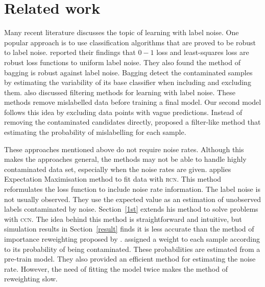 \documentclass[12pt]{article} %
\begin{document}
\section{Related work}
Many recent literature discusses the topic of learning with label noise. One popular approach is to use classification algorithms that are proved to be robust to label noise. \citet{frenay2014classification} reported their findings that $0-1$ loss and least-squares loss are robust loss functions to uniform label noise. %
They also found the method of bagging is robust against label noise. Bagging detect the contaminated samples by estimating the variability of its base classifier when including and excluding them. %
\citet{frenay2014classification} also discussed filtering methods for learning with label noise. These methods remove mislabelled data before training a final model. Our second model follows this idea by excluding data points with vague predictions. Instead of removing the contaminated candidates directly, \citet{yang2018adasampling} proposed a filter-like method that estimating the probability of mislabelling for each sample.

These approaches mentioned above do not require noise rates. Although this makes the approaches general, the methods may not be able to handle highly contaminated data set, especially when the noise rates are given. \citet{pmlr-v20-biggio11} applies Expectation Maximisation method to fit data with \textsc{rcn}. This method reformulates the loss function to include noise rate information. The label noise is not usually observed. They use the expected value as an estimation of unobserved labels contaminated by noise. Section~\ref{1st} extends his method to solve problems with \textsc{ccn}. The idea behind this method is straightforward and intuitive, but  simulation results in Section~\ref{result} finds it is less accurate than the method of importance reweighting proposed by \citet{liu2016classification}. \citet{liu2016classification} assigned a weight to each sample according to its probability of being contaminated. These probabilities are estimated from a pre-train model. They also provided an efficient method for estimating the noise rate. However, the need of fitting the model twice makes the method of reweighting slow.
\end{document}
